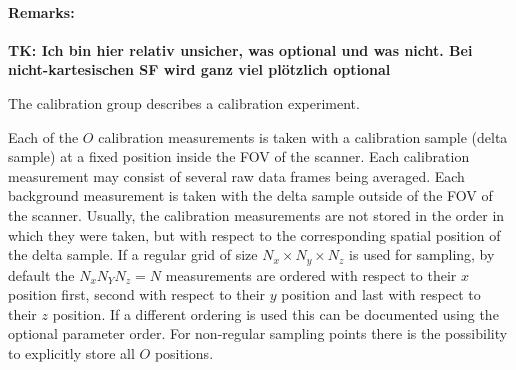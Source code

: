 \documentclass[landscape,a4paper]{article} %
\newcommand{\inlvar}[1]{{\ttfamily#1}}
\begin{document}
\begin{multicols}{2}
\paragraph{Remarks:}
\textbf{TK: Ich bin hier relativ unsicher, was optional und was nicht. Bei nicht-kartesischen SF wird ganz viel plötzlich optional}


The calibration group describes a calibration experiment.

Each of the $O$ calibration measurements is taken with a calibration sample (delta sample) at a fixed position inside the FOV of the scanner. Each calibration measurement may consist of several raw data frames being averaged. Each background measurement is taken with the delta sample outside of the FOV of the scanner. Usually, the calibration measurements are not stored in the order in which they were taken, but with respect to the corresponding spatial position of the delta sample. If a regular grid of size $N_x \times N_y \times N_z$ is used for sampling, by default the $N_xN_YN_z = N$ measurements are ordered with respect to their $x$ position first, second with respect to their $y$ position and last with respect to their $z$ position. If a different ordering is used this can be documented using the optional parameter \inlvar{order}. For non-regular sampling points there is the possibility to explicitly store all $O$ positions.
\end{multicols}
\end{document}
